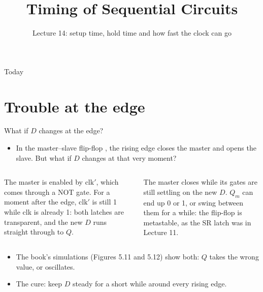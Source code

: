 \documentclass[10pt]{wosm-slides}
\title[Lecture 14 \textperiodcentered\ Timing of Sequential Circuits]{Timing of
  Sequential Circuits}
\subtitle{Lecture 14: setup time, hold time and how fast the clock can go}
\begin{document}
\maketitle

\begin{frame}{Today}
  \tableofcontents
\end{frame}

\section{Trouble at the edge}

\begin{frame}{What if $D$ changes at the edge?}
  \begin{itemize}
    \item In the master--slave flip-flop , the rising edge closes the
      master and opens the slave. But what if $D$ changes at that very moment?
  \end{itemize}

  \begin{columns}[T, totalwidth=\textwidth]
      \par\smallskip
      The master is enabled by $\mathrm{clk}'$, which comes through a NOT gate. For
      a moment after the edge, $\mathrm{clk}'$ is still 1 while clk is already 1:
      \alert{both} latches are transparent, and the new $D$ runs straight through
      to $Q$.
      \par\smallskip
      The master closes while its gates are still settling on the new $D$. $Q_m$
      can end up 0 or 1, or swing between them for a while: the flip-flop is
      \alert{metastable}, as the SR latch was in Lecture 11.
  \end{columns}

  \medskip
  \begin{itemize}
    \item The book's simulations (Figures 5.11 and 5.12) show both: $Q$ takes the
      wrong value, or oscillates.
    \item The cure: keep $D$ steady for a short while around every rising edge.
  \end{itemize}
\end{frame}
\end{document}
